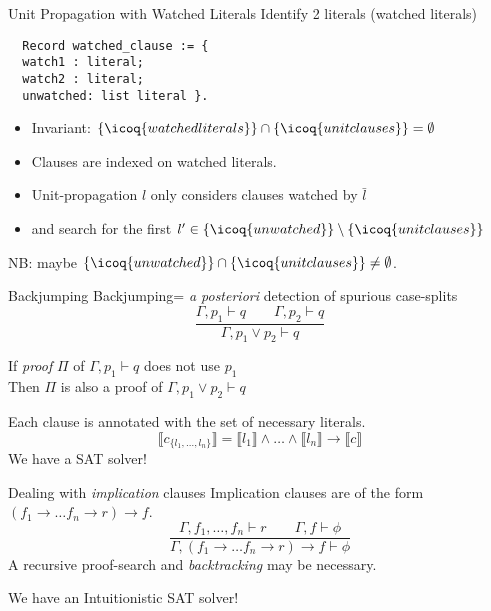 \documentclass{beamer}
\begin{document}
\begin{frame}[fragile]{Unit Propagation with Watched Literals}
Identify 2 literals (watched literals)
\begin{verbatim}
  Record watched_clause := {
  watch1 : literal;
  watch2 : literal;
  unwatched: list literal }.
\end{verbatim}
\begin{itemize}
\item Invariant: $\{\icoq{watched literals} \} \cap \{ \icoq{unit clauses} \} = \emptyset$
\item Clauses are indexed on watched literals.
\item Unit-propagation $l$ only considers clauses watched by $\bar{l}$
\item and search for the first $l' \in \{\icoq{unwatched}\} \setminus \{ \icoq{unit clauses} \}$
\end{itemize}
NB: maybe $\{ \icoq{unwatched} \} \cap \{ \icoq{unit clauses} \} \neq \emptyset$.
\end{frame}


\begin{frame}{Backjumping}
  Backjumping= \emph{a posteriori} detection of spurious case-splits
  \[
   \dfrac{\Gamma,p_1 \vdash q \qquad \Gamma, p_2 \vdash q}
   {\Gamma, p_1 \lor p_2 \vdash q}
 \]
 \begin{theorem}
   If \emph{proof} $\Pi$ of $\Gamma,p_1 \vdash q$ does not use $p_1$\\
   Then $\Pi$ is also a proof of $\Gamma, p_1 \lor p_2 \vdash q$
 \end{theorem}
 
 Each clause is annotated with the set of necessary literals.
\[
  \llbracket c_{\{l_1,\dots,l_n\}} \rrbracket = \llbracket l_1
  \rrbracket \land \dots \land \llbracket l_n \rrbracket \rightarrow
  \llbracket c \rrbracket
\]
We have a SAT solver! 
\end{frame}

\begin{frame}{Dealing with \emph{implication} clauses}
  Implication clauses are of the form $(f_1 \to \dots f_n \to r) \to f$.\\
  \bigskip
  \[
    \dfrac{\Gamma, f_1,\dots, f_n \vdash r \qquad \Gamma, f \vdash \phi}
    { \Gamma , (f_1 \to \dots f_n \to r) \to f \vdash \phi}
  \]
  A recursive proof-search and \emph{backtracking} may be necessary.\\
  \bigskip    

  We have an Intuitionistic SAT solver!
\end{frame}
\end{document}
